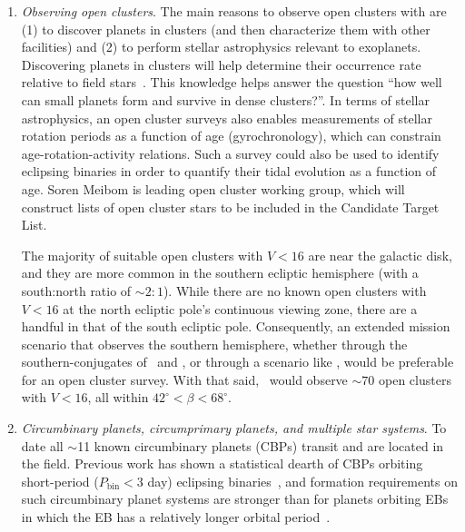 \begin{enumerate}
	\item \textit{Observing open clusters}.
	The main reasons to observe open clusters with \tess are (1) to discover planets in clusters (and then characterize them with other facilities) and (2) to perform stellar astrophysics relevant to exoplanets.
	Discovering planets in clusters will help determine their occurrence rate relative to field stars~\citep{meibom_same_2013}.
	This knowledge helps answer the question ``how well can small planets form and survive in dense clusters?''. 
	In terms of stellar astrophysics, an open cluster surveys also enables measurements of stellar rotation periods as a function of age (gyrochronology), which can constrain age-rotation-activity relations.
	Such a survey could also be used to identify eclipsing binaries in order to quantify their tidal evolution as a function of age.
	Soren Meibom is leading \tesss open cluster working group, which will construct lists of open cluster stars to be included in the \tess Candidate Target List.
	
	The majority of suitable open clusters with $V<16$ are near the galactic disk, and they are more common in the southern ecliptic hemisphere (with a south:north ratio of $\sim\!2:1$).
	While there are no known open clusters with $V<16$ at the north ecliptic pole's continuous viewing zone, there are a handful in that of the south ecliptic pole.
	Consequently, an extended mission scenario that observes the southern hemisphere, whether through the southern-conjugates of \nhemi\ and \npole, or through a scenario like \shemiAvoid, would be preferable for an open cluster survey.
	With that said, \npole\ would observe $\sim70$ open clusters with $V<16$, all within $42^\circ<\beta<68^\circ$.
	
	\item \textit{Circumbinary planets, circumprimary planets, and multiple star systems}.
	To date all $\sim$11 known circumbinary planets (CBPs) transit and are located in the \kepler field.
	Previous work has shown a statistical dearth of CBPs orbiting short-period ($P_\mathrm{bin} < 3$ day) eclipsing binaries~\citep{armstrong_abundance_2014,martin_planets_2014}, and formation requirements on such circumbinary planet systems are stronger than for planets orbiting EBs in which the EB has a relatively longer orbital period~\citep{martin_no_2015}.
	

\end{enumerate}
